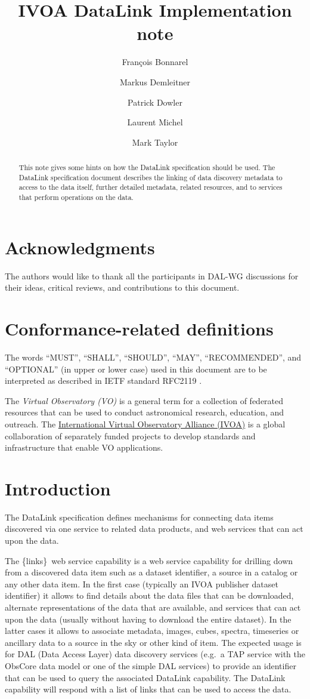 \documentclass[11pt,a4paper]{ivoa}
\title{IVOA DataLink Implementation note}
\author[http://www.ivoa.net/twiki/bin/view/IVOA/FrancoisBonnarel]
       {Fran\c{c}ois Bonnarel}
\author[http://www.ivoa.net/twiki/bin/view/IVOA/MarkusDemleitner]
       {Markus Demleitner}
\author[http://www.ivoa.net/twiki/bin/view/IVOA/PatrickDowler]
       {Patrick Dowler}
\author[http://www.ivoa.net/twiki/bin/view/IVOA/LaurentMichel]
       {Laurent Michel}
\author[http://www.ivoa.net/twiki/bin/view/IVOA/MarkTaylor]
       {Mark Taylor}
\newcommand{\blinks}{\{links\}}
\begin{document}
\begin{abstract}
This note gives some hints on how the DataLink specification should be used. The DataLink 
specification document \citep{2023ivoa.spec.0617D} describes the linking of data discovery 
metadata to access to the data itself, further detailed metadata, related resources, and 
to services that perform operations on the data. 
\end{abstract}


\section*{Acknowledgments}

The authors would like to thank all the participants in DAL-WG discussions
for their ideas, critical reviews, and contributions to this document.


\section*{Conformance-related definitions}

The words ``MUST'', ``SHALL'', ``SHOULD'', ``MAY'', ``RECOMMENDED'', and
``OPTIONAL'' (in upper or lower case) used in this document are to be
interpreted as described in IETF standard RFC2119 \citep{std:RFC2119}.

The \emph{Virtual Observatory (VO)} is a
general term for a collection of federated resources that can be used
to conduct astronomical research, education, and outreach.
The \href{http://www.ivoa.net}{International
Virtual Observatory Alliance (IVOA)} is a global
collaboration of separately funded projects to develop standards and
infrastructure that enable VO applications.


\section{Introduction}

The DataLink  specification \citep{2023ivoa.spec.0617D} defines mechanisms for connecting 
data items discovered via one service to  related data products, and web services
that can act upon the data.

The \blinks\ web service capability is a web service capability for drilling
down from a discovered data item such as  a dataset identifier, a source in a
catalog or any other data item. In the first case (typically an IVOA publisher
dataset identifier) it allows to find details about the data files that can be
downloaded, alternate representations of the data that are available, and
services that can act upon the data (usually without having to download
the entire dataset). In the latter cases it allows to associate metadata, images,
cubes, spectra, timeseries or ancillary data to a source in the sky or other
kind of item. The expected usage is for DAL (Data Access Layer)
data discovery services (e.g.\ a TAP service \citep{2010ivoa.spec.0327D}
with the ObsCore \citep{2017ivoa.spec.0509L} data
model or one of the simple DAL services) to provide an identifier that
can be used to query the associated DataLink capability. The DataLink
capability will respond with a list of links that can be used to access
the data. 
\end{document}
